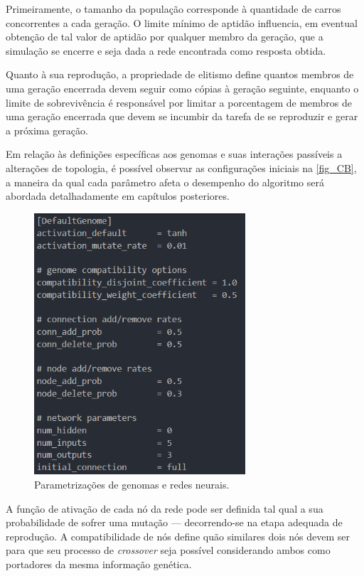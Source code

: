 Primeiramente, o tamanho da população corresponde à quantidade de carros concorrentes a cada geração.
O limite mínimo de aptidão influencia, em eventual obtenção de tal valor de aptidão por qualquer membro da
geração, que a simulação se encerre e seja dada a rede encontrada como resposta obtida.

Quanto à sua reprodução, a propriedade de elitismo define quantos membros de uma geração encerrada devem
seguir como cópias à geração seguinte, enquanto o limite de sobrevivência é responsável por limitar a
porcentagem de membros de uma geração encerrada que devem se incumbir da tarefa de se reproduzir e gerar a próxima geração.

Em relação às definições específicas aos genomas e suas interações passíveis a alterações de topologia,
é possível observar as configurações iniciais na \autoref{fig_CB}, a maneira da qual cada parâmetro afeta
o desempenho do algoritmo será abordada detalhadamente em capítulos posteriores.

\begin{figure}[htb]
        \centering
        \caption{\label{fig_CB}Parametrizações de genomas e redes neurais.}
        \includegraphics[width=0.7\textwidth]{images/CB.png}
\end{figure}

A função de ativação de cada nó da rede pode ser definida tal qual a sua probabilidade de sofrer uma mutação
— decorrendo-se na etapa adequada de reprodução. A compatibilidade de nós define quão similares dois nós
devem ser para que seu processo de \textit{crossover} seja possível considerando ambos como portadores da mesma informação genética.

